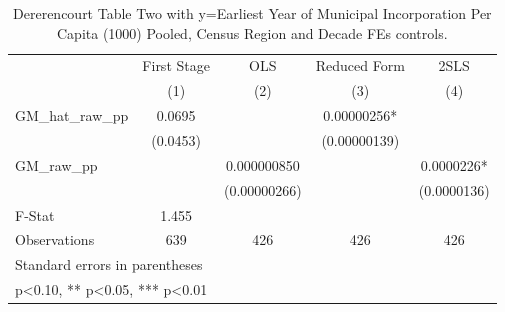 \begin{table}[htbp]\centering
\def\sym#1{\ifmmode^{#1}\else\(^{#1}\)\fi}
\caption{Dererencourt Table Two with y=Earliest Year of Municipal Incorporation Per Capita (1000) Pooled, Census Region and Decade FEs controls.}
\begin{tabular}{l*{4}{c}}
\toprule
                    & First Stage   &         OLS   &Reduced Form   &        2SLS   \\
                    &\multicolumn{1}{c}{(1)}   &\multicolumn{1}{c}{(2)}   &\multicolumn{1}{c}{(3)}   &\multicolumn{1}{c}{(4)}   \\
\midrule
GM\_hat\_raw\_pp       &      0.0695   &               &  0.00000256*  &               \\
                    &    (0.0453)   &               &(0.00000139)   &               \\
\addlinespace
GM\_raw\_pp           &               & 0.000000850   &               &   0.0000226*  \\
                    &               &(0.00000266)   &               & (0.0000136)   \\
\midrule
F-Stat              &       1.455   &               &               &               \\
Observations        &         639   &         426   &         426   &         426   \\
\bottomrule
\multicolumn{5}{l}{\footnotesize Standard errors in parentheses}\\
\multicolumn{5}{l}{\footnotesize * p<0.10, ** p<0.05, *** p<0.01}\\
\end{tabular}
\end{table}
